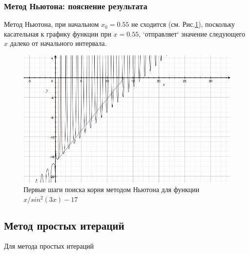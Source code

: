 \documentclass{article}
\begin{document}
\subsubsection{Метод Ньютона: пояснение результата}
  Метод Ньютона, при начальном $x_{0} = 0.55$ не сходится (см.
  Рис.\ref{equ_newton_img}), поскольку касательная к графику функции при
  $x = 0.55$, `отправляет` значение следующего $x$ далеко от начального
  интервала.
   
  \begin{figure}[h!]
    \includegraphics[width=13cm]{equations_newton.png}
    \caption{Первые шаги поиска корня методом Ньютона для функции $x/sin^2(3x)
    - 17$}
    \label{equ_newton_img}
  \end{figure}

\subsection{Метод простых итераций}
Для метода простых итераций 
\end{document}
